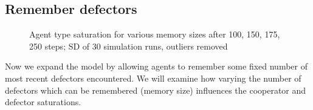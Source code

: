 \documentclass[english]{article}
\begin{document}
\subsection{Remember defectors}
\begin{figure}[!ht]
  \centering
  \caption{Agent type saturation for various memory sizes after 100, 150, 175, 250 steps; SD of 30 simulation runs, outliers removed}
  \label{fig:agent_sat/memory_size}
\end{figure}

Now we expand the model by allowing agents to remember some fixed number of most recent defectors encountered. We will examine how varying the number of defectors which can be remembered (memory size) influences the cooperator and defector saturations.
\end{document}
